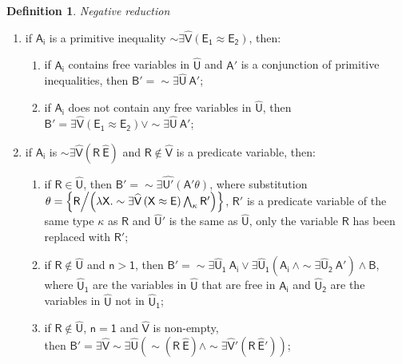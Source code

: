 \documentclass[inscr,ack,preface]{dithesis}
\theoremstyle{definition}
\newtheorem{definition}{Definition}[]
\newcommand{\msf}[1]{$\mathsf{#1}$}
\begin{document}
\begin{definition}{\emph{Negative reduction}}
\begin{enumerate}
        then \msf{B' = \sim \exists \widehat{U} \left( A_1 \land \dots \land A_i' \land \dots \land A_n \right)};
  \item if \msf{A_i} is a primitive inequality \msf{\sim \exists \widehat{V} \left( E_1 \approx E_2 \right)}, then:
        \begin{enumerate}
          \item if \msf{A_i} contains free variables in \msf{\widehat{U}} and \msf{A'} is a conjunction of primitive inequalities, then \msf{B' = \sim \exists \widehat{U} ~ A'};
          \item if \msf{A_i} does not contain any free variables in \msf{\widehat{U}}, then \msf{B' = \exists \widehat{V} \left( E_1 \approx E_2 \right) \lor \sim \exists \widehat{U} ~ A'};
        \end{enumerate}
  \item if \msf{A_i} is \msf{\sim \exists \widehat{V} \left( R ~ \widehat{E} \right)} and \msf{R \not\in \widehat{V}} is a predicate variable,
        then:
        \begin{enumerate}
          \item if \msf{R \in \widehat{U}},
                then \msf{B' = \sim \exists \widehat{U'} \left( A' \theta \right)},
                where substitution \\ \msf{\theta = \left\{ R \middle/ \left( \lambda X . \sim \exists \widehat{V} \left( X \approx E \right) \bigwedge_{\kappa} R' \right) \right\}},
                \msf{R'} is a predicate variable of the same type \msf{\kappa} as \msf{R}
                and \msf{\widehat{U}'} is the same as \msf{\widehat{U}}, only the variable \msf{R} has been replaced with \msf{R'};
          \item if \msf{R \not\in \widehat{U}} and \msf{n > 1},
                then \msf{B' = \sim \exists \widehat{U}_1 ~ A_i \lor \exists \widehat{U}_1 \left( A_i ~ \land \sim \exists \widehat{U}_2 ~ A' \right) \land B},
                where \msf{\widehat{U}_1} are the variables in \msf{\widehat{U}} that are free in \msf{A_i} and \msf{\widehat{U}_2} are the variables in \msf{\widehat{U}} not in \msf{\widehat{U}_1};
          \item if \msf{R \not\in \widehat{U}}, \msf{n = 1} and \msf{\widehat{V}} is non-empty, \\
                then \msf{B' = \exists \widehat{V} \sim \exists \widehat{U} \left( \sim \left( R ~ \widehat{E} \right) \land \sim \exists \widehat{V}' \left( R ~ \widehat{E}' \right) \right)};
        \end{enumerate}

\end{enumerate}
\end{definition}
\end{document}
